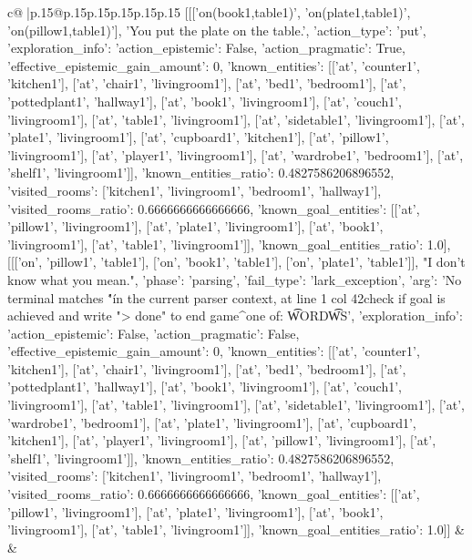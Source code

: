 \documentclass{article}
\begin{document}
{\begin{supertabular}{c@{$\;$}|p{.15\linewidth}@{}p{.15\linewidth}p{.15\linewidth}p{.15\linewidth}p{.15\linewidth}p{.15\linewidth}}
{{{	 [[['on(book1,table1)', 'on(plate1,table1)', 'on(pillow1,table1)'], 'You put the plate on the table.', {'action_type': 'put', 'exploration_info': {'action_epistemic': False, 'action_pragmatic': True, 'effective_epistemic_gain_amount': 0, 'known_entities': [['at', 'counter1', 'kitchen1'], ['at', 'chair1', 'livingroom1'], ['at', 'bed1', 'bedroom1'], ['at', 'pottedplant1', 'hallway1'], ['at', 'book1', 'livingroom1'], ['at', 'couch1', 'livingroom1'], ['at', 'table1', 'livingroom1'], ['at', 'sidetable1', 'livingroom1'], ['at', 'plate1', 'livingroom1'], ['at', 'cupboard1', 'kitchen1'], ['at', 'pillow1', 'livingroom1'], ['at', 'player1', 'livingroom1'], ['at', 'wardrobe1', 'bedroom1'], ['at', 'shelf1', 'livingroom1']], 'known_entities_ratio': 0.4827586206896552, 'visited_rooms': ['kitchen1', 'livingroom1', 'bedroom1', 'hallway1'], 'visited_rooms_ratio': 0.6666666666666666, 'known_goal_entities': [['at', 'pillow1', 'livingroom1'], ['at', 'plate1', 'livingroom1'], ['at', 'book1', 'livingroom1'], ['at', 'table1', 'livingroom1']], 'known_goal_entities_ratio': 1.0}}], [[['on', 'pillow1', 'table1'], ['on', 'book1', 'table1'], ['on', 'plate1', 'table1']], "I don't know what you mean.", {'phase': 'parsing', 'fail_type': 'lark_exception', 'arg': 'No terminal matches \'"\' in the current parser context, at line 1 col 42\n\nhen check if goal is achieved and write "> done" to end game\n                                        ^\nExpected one of: \n\t* WORD\n\t* WS\n', 'exploration_info': {'action_epistemic': False, 'action_pragmatic': False, 'effective_epistemic_gain_amount': 0, 'known_entities': [['at', 'counter1', 'kitchen1'], ['at', 'chair1', 'livingroom1'], ['at', 'bed1', 'bedroom1'], ['at', 'pottedplant1', 'hallway1'], ['at', 'book1', 'livingroom1'], ['at', 'couch1', 'livingroom1'], ['at', 'table1', 'livingroom1'], ['at', 'sidetable1', 'livingroom1'], ['at', 'wardrobe1', 'bedroom1'], ['at', 'plate1', 'livingroom1'], ['at', 'cupboard1', 'kitchen1'], ['at', 'player1', 'livingroom1'], ['at', 'pillow1', 'livingroom1'], ['at', 'shelf1', 'livingroom1']], 'known_entities_ratio': 0.4827586206896552, 'visited_rooms': ['kitchen1', 'livingroom1', 'bedroom1', 'hallway1'], 'visited_rooms_ratio': 0.6666666666666666, 'known_goal_entities': [['at', 'pillow1', 'livingroom1'], ['at', 'plate1', 'livingroom1'], ['at', 'book1', 'livingroom1'], ['at', 'table1', 'livingroom1']], 'known_goal_entities_ratio': 1.0}}]] 
	  } 
	   } 
	   } 
	 & & \\ 
 

    \theutterance {}  


\end{supertabular}}
\end{document}
